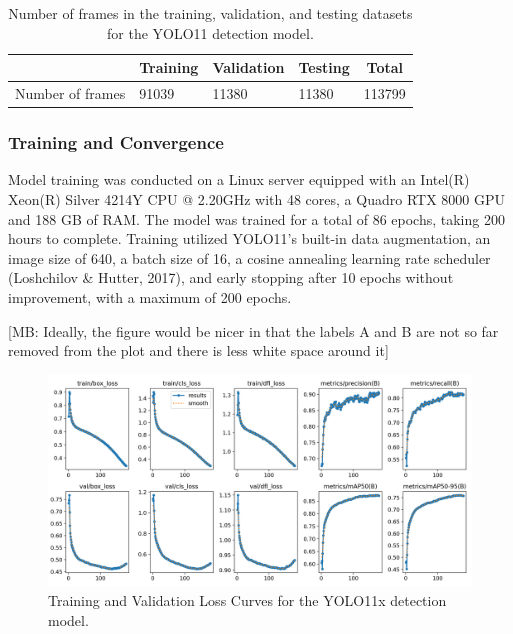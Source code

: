 \documentclass[
  man,floatsintext]{apa6}
\begin{document}
\begin{table}[tbp]

\begin{center}
\begin{threeparttable}

\caption{\label{tab:det-dataset-splits}Number of frames in the training, validation, and testing datasets for the YOLO11 detection model.}

\begin{tabular}{lllll}
\toprule
 & \multicolumn{1}{c}{Training} & \multicolumn{1}{c}{Validation} & \multicolumn{1}{c}{Testing} & \multicolumn{1}{c}{Total}\\
\midrule
Number of frames & 91039 & 11380 & 11380 & 113799\\
\bottomrule
\end{tabular}

\end{threeparttable}
\end{center}

\end{table}

\subsubsection{Training and Convergence}\label{training-face}

Model training was conducted on a Linux server equipped with an Intel(R) Xeon(R) Silver 4214Y CPU @ 2.20GHz with 48 cores, a Quadro RTX 8000 GPU and 188 GB of RAM. The model was trained for a total of 86 epochs, taking 200 hours to complete. Training utilized YOLO11's built-in data augmentation, an image size of 640, a batch size of 16, a cosine annealing learning rate scheduler (Loshchilov \& Hutter, 2017), and early stopping after 10 epochs without improvement, with a maximum of 200 epochs.

{[}MB: Ideally, the figure would be nicer in that the labels A and B are not so far removed from the plot and there is less white space around it{]}

\begin{figure}

{\centering \includegraphics[width=450px]{images/yolo_loss_curves} 

}

\caption{Training and Validation Loss Curves for the YOLO11x detection model.}\label{fig:det-loss-curves}
\end{figure}
\end{document}
